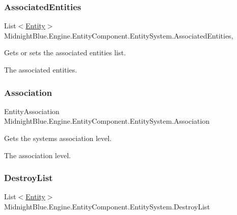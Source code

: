 \subsubsection{\texorpdfstring{Associated\+Entities}{AssociatedEntities}}
{\footnotesize\ttfamily List$<$\hyperlink{class_midnight_blue_1_1_engine_1_1_entity_component_1_1_entity}{Entity}$>$ Midnight\+Blue.\+Engine.\+Entity\+Component.\+Entity\+System.\+Associated\+Entities\hspace{0.3cm}{\ttfamily [get]}, {\ttfamily [set]}}



Gets or sets the associated entities list. 

The associated entities.\hypertarget{class_midnight_blue_1_1_engine_1_1_entity_component_1_1_entity_system_a6b8663934bf577c3109242f1c4389c40}{}\label{class_midnight_blue_1_1_engine_1_1_entity_component_1_1_entity_system_a6b8663934bf577c3109242f1c4389c40} 
\subsubsection{\texorpdfstring{Association}{Association}}
{\footnotesize\ttfamily Entity\+Association Midnight\+Blue.\+Engine.\+Entity\+Component.\+Entity\+System.\+Association\hspace{0.3cm}{\ttfamily [get]}}



Gets the systems association level. 

The association level.\hypertarget{class_midnight_blue_1_1_engine_1_1_entity_component_1_1_entity_system_a4f65ada9bcabd5a953e05e5567c83ca9}{}\label{class_midnight_blue_1_1_engine_1_1_entity_component_1_1_entity_system_a4f65ada9bcabd5a953e05e5567c83ca9} 
\subsubsection{\texorpdfstring{Destroy\+List}{DestroyList}}
{\footnotesize\ttfamily List$<$\hyperlink{class_midnight_blue_1_1_engine_1_1_entity_component_1_1_entity}{Entity}$>$ Midnight\+Blue.\+Engine.\+Entity\+Component.\+Entity\+System.\+Destroy\+List\hspace{0.3cm}{\ttfamily [get]}}



